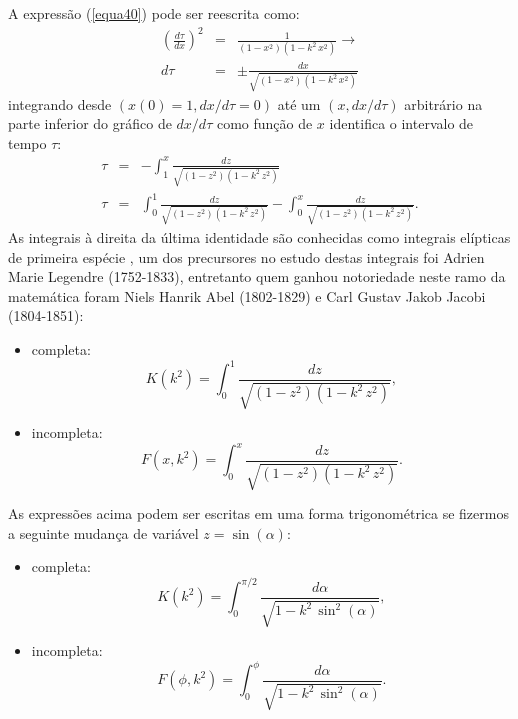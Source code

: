\documentclass[12pt,openright,twoside,english,brazil]{abntex2}
\begin{document}
A expressão (\ref{equa40}) pode ser reescrita como:
\begin{eqnarray}
 \left( \frac{d\tau}{dx} \right)^2  & = & \frac{1}{(1 - x^2) (1 - k^2\, x^2)} \rightarrow \nonumber \\
 d\tau & = & \pm \frac{dx}{\sqrt{(1 - x^2) (1 - k^2\, x^2)}}
 \label{equa41}
\end{eqnarray}
integrando desde $(x(0)=1,dx/d\tau=0)$ até um $(x,dx/d\tau)$ arbitrário na parte inferior do gráfico de $dx/d\tau$ como função de $x$ identifica o intervalo de tempo $\tau$:
\begin{eqnarray}
 \tau & = & -\int_{1}^{x} \frac{dz}{\sqrt{(1 - z^2) (1 - k^2\, z^2)}} \nonumber \\
 \tau & = & \int_{0}^{1} \frac{dz}{\sqrt{(1 - z^2) (1 - k^2\, z^2)}} - \int_{0}^{x} \frac{dz}{\sqrt{(1 - z^2) (1 - k^2\, z^2)}}.
\label{equa43}
\end{eqnarray}
As integrais à direita da última identidade são conhecidas como integrais elípticas de primeira espécie \cite{abramo}, um dos precursores no estudo destas integrais foi Adrien Marie Legendre (1752-1833), entretanto quem ganhou notoriedade neste ramo da matemática foram Niels Hanrik Abel (1802-1829) e Carl Gustav Jakob Jacobi (1804-1851):
\begin{itemize}
 \item completa: \begin{equation}
                  K(k^2) = \int_{0}^{1} \frac{dz}{\sqrt{(1 - z^2) (1 - k^2\, z^2)}},
                 \end{equation}
 \item incompleta: \begin{equation}
                    F(x,k^2) = \int_{0}^{x} \frac{dz}{\sqrt{(1 - z^2) (1 - k^2\, z^2)}}.
                   \end{equation}
\end{itemize}
As expressões acima podem ser escritas em uma forma trigonométrica se fizermos a seguinte mudança de variável $z=\sin{(\alpha)}$:
\begin{itemize}
 \item completa: \begin{equation}
                  K(k^2) = \int_{0}^{\pi/2} \frac{d\alpha}{\sqrt{1 - k^2\, \sin^2{(\alpha)}}},
                  \label{equa46}
                 \end{equation}
 \item incompleta: \begin{equation}
                    F(\phi,k^2) = \int_{0}^{\phi} \frac{d\alpha}{\sqrt{1 - k^2\, \sin^2{(\alpha)}}}.
                   \end{equation}
\end{itemize}
 
\end{document}
